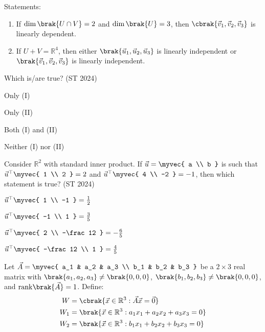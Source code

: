 Statements:  
\begin{enumerate}[label=(\Roman*)]

	\item If $\dim\brak{U \cap V} = 2$ and $\dim\brak{U} = 3$, then $\cbrak{\vec{v}_1, \vec{v}_2, \vec{v}_3}$ is linearly dependent.  
	\item  If $U + V = \mathbb{R}^4$, then either $\brak{\vec{u}_1, \vec{u}_2, \vec{u}_3}$ is linearly independent or $\brak{\vec{v}_1, \vec{v}_2, \vec{v}_3}$ is linearly independent.
\end{enumerate}
Which is/are true?
\hfill (ST 2024)
\begin{enumerate}
\begin{multicols}{4}
\item Only (I)
\item Only (II)
\item Both (I) and (II)
\item Neither (I) nor (II)
\end{multicols}
\end{enumerate}
\item 
Consider $\mathbb{R}^2$ with standard inner product. If $\vec{u} = \myvec{ a \\ b }$ is such that  
$ \vec{u}^{\top} \myvec{ 1 \\ 2 }  = 2$  
and  
$ \vec{u}^{\top} \myvec{ 4 \\ -2 }  = -1$,  
then which statement is true?
\hfill (ST 2024)
\begin{enumerate}
\begin{multicols}{4}
\item $ \vec{u}^{\top} \myvec{ 1 \\ -1 }  = \frac12$
\item $ \vec{u}^{\top} \myvec{ -1 \\ 1 }  = \frac35$
\item $ \vec{u}^{\top} \myvec{ 2 \\ -\frac12 }  = -\frac65$
\item $ \vec{u}^{\top} \myvec{ -\frac12 \\ 1 }  = \frac45$
\end{multicols}
\end{enumerate}
\item 
Let $\vec{A} = \myvec{ a_1 & a_2 & a_3 \\ b_1 & b_2 & b_3 }$ be a $2\times 3$ real matrix with $\brak{a_1,a_2,a_3} \neq \brak{0,0,0}$, $\brak{b_1,b_2,b_3} \neq \brak{0,0,0}$, and $\mathrm{rank}\brak{\vec{A}} = 1$.  
Define:  
\begin{align*}
	W &= \cbrak{ \vec{x} \in \mathbb{R}^3 : \vec{A}\vec{x} = \vec{0} }  
	\\
	W_1 &= \brak{ \vec{x} \in \mathbb{R}^3 : a_1 x_1 + a_2 x_2 + a_3 x_3 = 0} 
	\\
W_2 &= \brak{\vec{x} \in \mathbb{R}^3 : b_1 x_1 + b_2 x_2 + b_3 x_3 = 0}
\end{align*}

